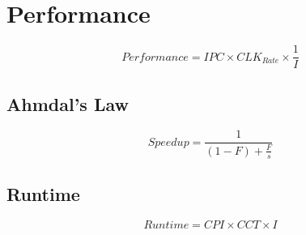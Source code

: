 \section{Performance}
\[
  Performance = IPC \times CLK_{Rate} \times \frac{1}{I}
\]

\subsection{Ahmdal's Law}
\[
  Speedup = \frac{1}{\left(1 - F\right) + \frac{F}{s}}
\]

\subsection{Runtime}
\[
  Runtime = CPI \times CCT \times I
\]




